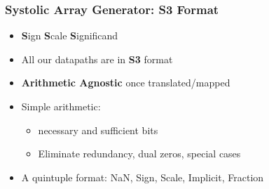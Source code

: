 \begin{frame}
\frametitle{Systolic Array Generator: S3 Format}

            \begin{itemize}
		    \item \textbf{S}ign \textbf{S}cale \textbf{S}ignificand
		    \item All our datapaths are in \textbf{S3} format
		    \item \textbf{Arithmetic Agnostic} once translated/mapped
                    \item Simple arithmetic:
			\begin{itemize}
                    		\item necessary and sufficient bits
                    		\item Eliminate redundancy, dual zeros, special cases
			\end{itemize}
                    \item A quintuple format: \textlangle NaN, Sign, Scale, Implicit, Fraction\textrangle
            \end{itemize}
            \begin{table}
                \centering
                \caption{Common computer number formats and their S3 translations.}
		    \vspace{-0.5cm}
                \label{table:s3_examples}
            \end{table}

\end{frame}

